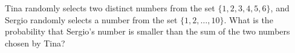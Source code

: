Tina randomly selects two distinct numbers from the set $\{1,2,3,4,5,6\}$, and Sergio randomly selects a number from the set $\{1,2,\dots,10\}$. What is the probability that Sergio's number is smaller than the sum of the two numbers chosen by Tina?
